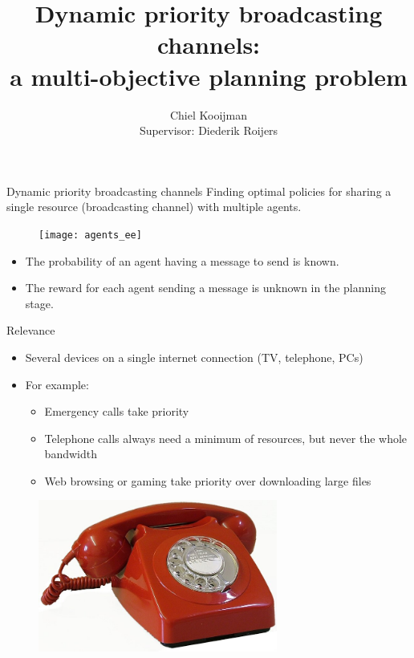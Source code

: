 \documentclass{beamer}
\author{Chiel Kooijman\\ Supervisor: Diederik Roijers}
\title{Dynamic priority broadcasting channels:\\a multi-objective planning problem}
\begin{document}
\frame{\titlepage}



\begin{frame}{Dynamic priority broadcasting channels}
	Finding optimal policies for sharing a single resource (broadcasting
	channel) with multiple agents.
	\begin{figure}
		\centering
		\texttt{[image: agents\_ee]}
	   \label{fig:agents_ee}
	\end{figure}
	\begin{itemize}
		\item The probability of an agent having a message to send is known.
		\item The reward for each agent sending a message is unknown in the
			planning stage.
	\end{itemize}
\end{frame}


\begin{frame}{Relevance}
	\begin{itemize}
		\item Several devices on a single internet connection (TV, telephone, PCs)
		\item For example:
		\begin{itemize}
			\item Emergency calls take priority
			\item Telephone calls always need a minimum of resources, but never
				the whole bandwidth
			\item Web browsing or gaming take priority over downloading large files
		\end{itemize}
	\end{itemize}
	\begin{figure}
		\includegraphics[height=5cm]{telephone}
	   \label{fig:telephone}
	\end{figure}
\end{frame}
\end{document}

